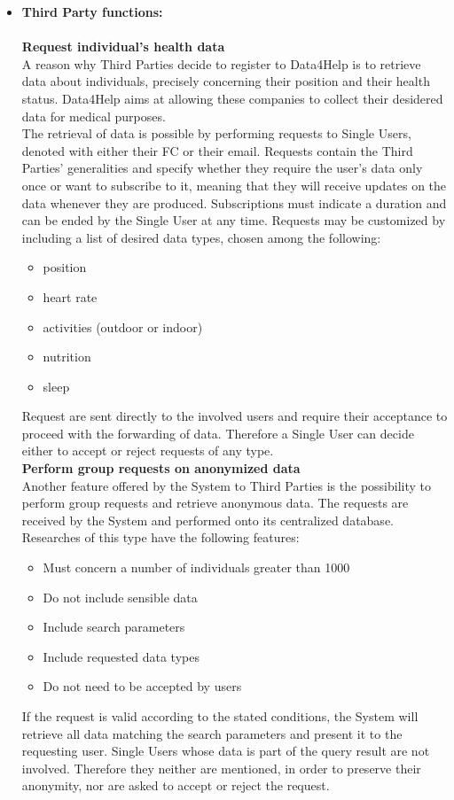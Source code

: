 \documentclass[titlepage]{article}
\begin{document}
\begin{itemize}
	\item{\bf Third Party functions:}\\
	\\
	{\bf Request individual’s health data}\\
A reason why Third Parties decide to register to Data4Help is to retrieve data about individuals, precisely concerning their position and their health status. Data4Help aims at allowing these companies to collect their desidered data for medical purposes. \\
The retrieval of data is possible by performing requests to Single Users, denoted with either their FC or their email. Requests contain the Third Parties’ generalities and specify whether they require the user’s data only once or want to subscribe to it, meaning that they will receive updates on the data whenever they are produced. Subscriptions must indicate a duration and can be ended by the Single User at any time. Requests may be customized by including a list of desired data types, chosen among the following:
\begin{itemize}
\item position
\item heart rate
\item activities (outdoor or indoor)
\item nutrition
\item sleep \\
\end{itemize}
Request are sent directly to the involved users and require their acceptance to proceed with the forwarding of data. Therefore a Single User can decide either to accept or reject requests of any type.\\

{\bf Perform group requests on anonymized data}\\
Another feature offered by the System to Third Parties is the possibility to perform group requests and retrieve anonymous data. The requests are received by the System and performed onto its centralized database. Researches of this type have the following features:
\begin{itemize}
\item Must concern a number of individuals greater than 1000
\item Do not include sensible data
\item Include search parameters
\item Include requested data types
\item Do not need to be accepted by users\\
\end{itemize}
If the request is valid according to the stated conditions, the System will retrieve all data matching the search parameters and present it to the requesting user. Single Users whose data is part of the query result are not involved. Therefore they neither are mentioned, in order to preserve their anonymity, nor are asked to accept or reject the request.\\


\end{itemize}
\end{document}
